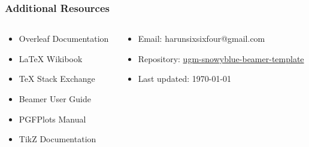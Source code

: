 \documentclass[aspectratio=169,professionalfonts]{beamer}
\begin{document}
\begin{frame}
    \frametitle{Additional Resources}
    
    \begin{columns}[T]
        \begin{column}{0.48\textwidth}
            \begin{tcolorbox}[colback=ugmLightGrey,colframe=ugmBlue,title=LaTeX Resources]
                \begin{itemize}
                    \item Overleaf Documentation
                    \item LaTeX Wikibook
                    \item TeX Stack Exchange
                    \item Beamer User Guide
                    \item PGFPlots Manual
                    \item TikZ Documentation
                \end{itemize}
            \end{tcolorbox}
        \end{column}
        
        \begin{column}{0.48\textwidth}
            \begin{tcolorbox}[colback=ugmLightGrey,colframe=ugmBlue,title=Contacts and Collaboration]
                \begin{itemize}
                    \item Email: harunsixsixfour@gmail.com
                    \item Repository: \href{https://github.com/runsdev/ugm-snowyblue-beamer-template}{ugm-snowyblue-beamer-template}
                    \item Last updated: \today
                \end{itemize}
            \end{tcolorbox}
        \end{column}
    \end{columns}
\end{frame}
\end{document}
